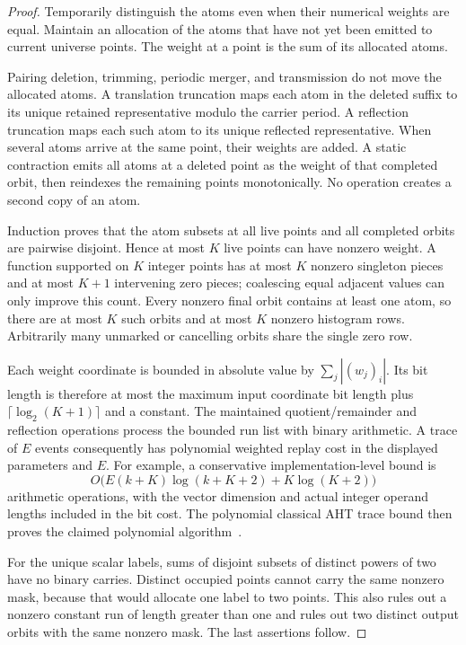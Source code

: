 \begin{proof}
Temporarily distinguish the atoms even when their numerical weights are
equal.  Maintain an allocation of the atoms that have not yet been emitted
to current universe points.  The weight at a point is the sum of its
allocated atoms.

Pairing deletion, trimming, periodic merger, and transmission do not move
the allocated atoms.  A translation truncation maps each atom in the deleted
suffix to its unique retained representative modulo the carrier period.
A reflection truncation maps each such atom to its unique reflected
representative.  When several atoms arrive at the same point, their weights
are added.  A static contraction emits all atoms at a deleted point as the
weight of that completed orbit, then reindexes the remaining points
monotonically.  No operation creates a second copy of an atom.

Induction proves that the atom subsets at all live points and all completed
orbits are pairwise disjoint.  Hence at most $K$ live points can have nonzero
weight.  A function supported on $K$ integer points has at most $K$ nonzero
singleton pieces and at most $K+1$ intervening zero pieces; coalescing equal
adjacent values can only improve this count.  Every nonzero final orbit
contains at least one atom, so there are at most $K$ such orbits and at most
$K$ nonzero histogram rows.  Arbitrarily many unmarked or cancelling orbits
share the single zero row.

Each weight coordinate is bounded in absolute value by
$\sum_j |(w_j)_i|$.  Its bit length is therefore at most the maximum input
coordinate bit length plus $\lceil\log_2(K+1)\rceil$ and a constant.
The maintained quotient/remainder and reflection operations process the
bounded run list with binary arithmetic.  A trace of $E$ events consequently
has polynomial weighted replay cost in the displayed parameters and $E$.
For example, a conservative implementation-level bound is
\[
             O\bigl(E(k+K)\log(k+K+2)+K\log(K+2)\bigr)
\]
arithmetic operations, with the vector dimension and actual integer operand
lengths included in the bit cost.  The polynomial classical AHT trace bound
then proves the claimed polynomial algorithm~\cite{AHT2006}.

For the unique scalar labels, sums of disjoint subsets of distinct powers
of two have no binary carries.  Distinct occupied points cannot carry the
same nonzero mask, because that would allocate one label to two points.
This also rules out a nonzero constant run of length greater than one and
rules out two distinct output orbits with the same nonzero mask.  The last
assertions follow.
\end{proof}

